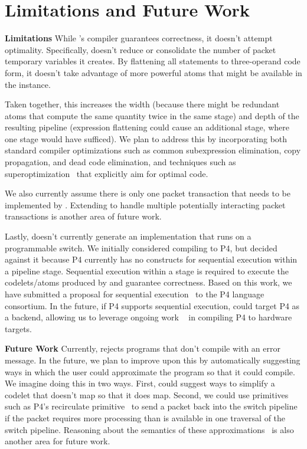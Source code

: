 \section{Limitations and Future Work}
\label{s:limitations}

\textbf{Limitations}
While \pktlanguage's compiler guarantees correctness, it doesn't attempt
optimality.  Specifically, \pktlanguage doesn't reduce or consolidate the
number of packet temporary variables it creates. By flattening all statements
to three-operand code form, it doesn't take advantage of more powerful atoms
that might be available in the \absmachine instance.

Taken together, this increases the width (because there might be redundant
atoms that compute the same quantity twice in the same stage) and depth of the
resulting pipeline (expression flattening could cause an additional stage,
where one stage would have sufficed). We plan to address this by incorporating
both standard compiler optimizations such as common subexpression elimination,
copy propagation, and dead code elimination, and techniques such as
superoptimization~\cite{stoke, superoptimizer} that explicitly aim for optimal
code.

We also currently assume there is only one packet transaction that needs to be
implemented by \pktlanguage. Extending \pktlanguage to handle multiple
potentially interacting packet transactions is another area of future work.

Lastly, \pktlanguage doesn't currently generate an implementation that runs on
a programmable switch. We initially considered compiling \pktlanguage to
P4, but decided against it because P4 currently has no constructs for
sequential execution within a pipeline stage. Sequential execution within a
stage is required to execute the codelets/atoms produced by \pktlanguage and
guarantee correctness. Based on this work, we have submitted a proposal for
sequential execution~\cite{p4-semantics} to the P4 language consortium. In the
future, if P4 supports sequential execution, \pktlanguage could target P4 as a
backend, allowing us to leverage ongoing work ~\cite{netronome,
xilinx,lavanya_compiler} in compiling P4 to hardware targets.

\textbf{Future Work}
Currently, \pktlanguage rejects programs that don't compile with an error
message.  In the future, we plan to improve upon this by automatically
suggesting ways in which the user could approximate the program so that it
could compile. We imagine doing this in two ways. First, \pktlanguage could
suggest ways to simplify a codelet that doesn't map so that it does map.
Second, we could use primitives such as P4's recirculate primitive~\cite{p4spec}
to send a packet back into the switch pipeline if the packet
requires more processing than is available in one traversal of the switch
pipeline. Reasoning about the semantics of these
approximations~\cite{sampsonApprox, chisel} is also another area for future
work.

